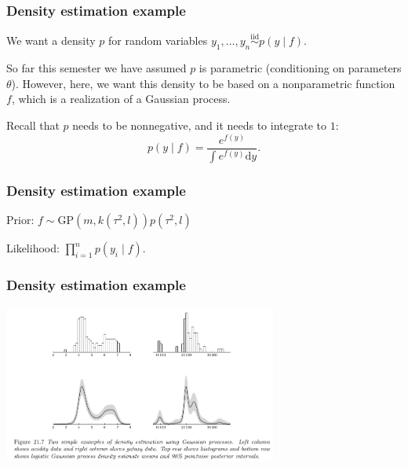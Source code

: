 \documentclass{beamer}
\begin{document}
\begin{frame}
\frametitle{Density estimation example}

We want a density $p$ for random variables $y_1, \ldots, y_n \overset{\text{iid}}{\sim} p(y \mid f)$. 
\newline

So far this semester we have assumed $p$ is parametric (conditioning on parameters $\theta$). However, here, we want this density to be based on a nonparametric function $f$, which is a realization of a Gaussian process.
\newline
\pause

Recall that $p$ needs to be nonnegative, and it needs to integrate to $1$:
$$
p(y \mid f) = \frac{e^{f(y)} }{ \int e^{f(y)} \text{d}y }.
$$

\end{frame}
\begin{frame}
\frametitle{Density estimation example}

Prior: $f \sim \text{GP}(m, k(\tau^2, l)) p(\tau^2, l)$
\newline

Likelihood: $\prod_{i=1}^n p(y_i \mid f)$. 

\end{frame}
\begin{frame}
\frametitle{Density estimation example}

\begin{center}
\includegraphics[width=90mm]{density_est.png}
\end{center}

\end{frame}
\end{document}
